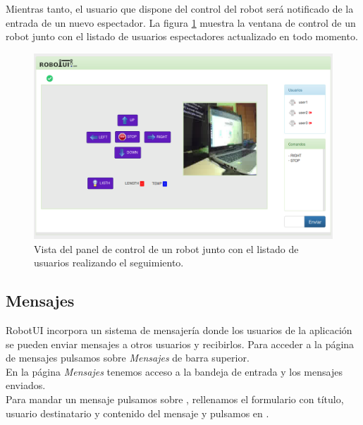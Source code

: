 Mientras tanto, el usuario que dispone del control del robot será notificado de la entrada de un nuevo espectador. La figura \ref{website:ventana-control} muestra la ventana de control de un robot junto con 
el listado de usuarios espectadores actualizado en todo momento.

\begin{figure}[H]
  \begin{center}
    \includegraphics[scale=.38]{imagenes/manual-usuario/vista_control.png}
  \end{center}
  \caption{ Vista del panel de control de un robot junto con el listado de usuarios realizando el seguimiento.}
  \label{website:ventana-control}
\end{figure}


\subsection{Mensajes}

RobotUI incorpora un sistema de mensajería donde los usuarios de la aplicación se pueden enviar mensajes a otros usuarios y recibirlos. Para acceder a la página de mensajes pulsamos sobre \emph{Mensajes} de barra superior.\\

En la página \emph{Mensajes} tenemos acceso a la bandeja de entrada y los mensajes enviados.\\

Para mandar un mensaje pulsamos sobre , rellenamos el formulario con título, usuario destinatario y contenido del mensaje y pulsamos en .

